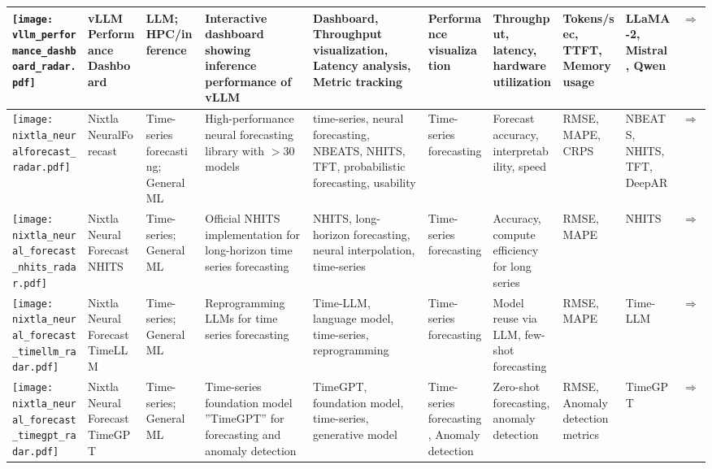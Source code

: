 \begin{landscape}
{\begin{longtable}{|p{}|p{}|p{}|p{}|p{}|p{}|p{}|p{}|p{}|p{}|}
\texttt{[image: vllm\_performance\_dashboard\_radar.pdf]} & vLLM Performance Dashboard & LLM; HPC/inference & Interactive dashboard showing inference performance of vLLM & Dashboard, Throughput visualization, Latency analysis, Metric tracking & Performance visualization & Throughput, latency, hardware utilization & Tokens/sec, TTFT, Memory usage & LLaMA-2, Mistral, Qwen & \cite{mo2024vllm_dashboard}\href{https://simon-mo-workspace.observablehq.cloud/vllm-dashboard-v0/}{$\Rightarrow$} \\ \hline
\texttt{[image: nixtla\_neuralforecast\_radar.pdf]} & Nixtla NeuralForecast & Time-series forecasting; General ML & High-performance neural forecasting library with \ensuremath{>}30 models & time-series, neural forecasting, NBEATS, NHITS, TFT, probabilistic forecasting, usability & Time-series forecasting & Forecast accuracy, interpretability, speed & RMSE, MAPE, CRPS & NBEATS, NHITS, TFT, DeepAR & \cite{olivares2022library_neuralforecast}\href{https://github.com/Nixtla/neuralforecast}{$\Rightarrow$} \\ \hline
\texttt{[image: nixtla\_neural\_forecast\_nhits\_radar.pdf]} & Nixtla Neural Forecast NHITS & Time-series; General ML & Official NHITS implementation for long-horizon time series forecasting & NHITS, long-horizon forecasting, neural interpolation, time-series & Time-series forecasting & Accuracy, compute efficiency for long series & RMSE, MAPE & NHITS & \cite{challu2023nhits}\href{https://github.com/Nixtla/neuralforecast}{$\Rightarrow$} \\ \hline
\texttt{[image: nixtla\_neural\_forecast\_timellm\_radar.pdf]} & Nixtla Neural Forecast TimeLLM & Time-series; General ML & Reprogramming LLMs for time series forecasting & Time-LLM, language model, time-series, reprogramming & Time-series forecasting & Model reuse via LLM, few-shot forecasting & RMSE, MAPE & Time-LLM & \cite{jin2024timellmtimeseriesforecasting}\href{https://github.com/Nixtla/neuralforecast}{$\Rightarrow$} \\ \hline
\texttt{[image: nixtla\_neural\_forecast\_timegpt\_radar.pdf]} & Nixtla Neural Forecast TimeGPT & Time-series; General ML & Time-series foundation model ''TimeGPT'' for forecasting and anomaly detection & TimeGPT, foundation model, time-series, generative model & Time-series forecasting, Anomaly detection & Zero-shot forecasting, anomaly detection & RMSE, Anomaly detection metrics & TimeGPT & \cite{garza2024timegpt1}\href{https://github.com/Nixtla/neuralforecast}{$\Rightarrow$} \\ \hline

\end{longtable}}
\end{landscape}
